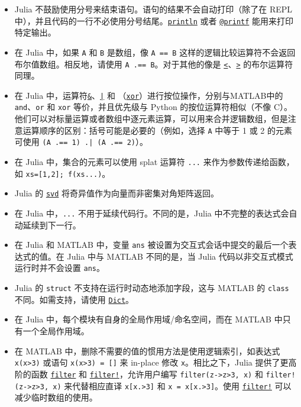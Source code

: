 \begin{itemize}
\item Julia 不鼓励使用分号来结束语句。语句的结果不会自动打印（除了在 REPL 中），并且代码的一行不必使用分号结尾。\hyperlink{783803254548423222}{\texttt{println}} 或者 \hyperlink{13954719910189591998}{\texttt{@printf}} 能用来打印特定输出。


\item 在 Julia 中，如果 \texttt{A} 和 \texttt{B} 是数组，像 \texttt{A == B} 这样的逻辑比较运算符不会返回布尔值数组。相反地，请使用 \texttt{A .== B}。对于其他的像是 \hyperlink{702782232449268329}{\texttt{<}}、\hyperlink{8677991761303191103}{\texttt{>}} 的布尔运算符同理。


\item 在 Julia 中，运算符\hyperlink{1494761116451616317}{\texttt{\&}}、\hyperlink{9633687763646488853}{\texttt{|}} 和 \hyperlink{7071880015536674935}{\texttt{\unicodeveebar{}}}（\hyperlink{7071880015536674935}{\texttt{xor}}）进行按位操作，分别与MATLAB中的\texttt{and}、\texttt{or} 和 \texttt{xor} 等价，并且优先级与 Python 的按位运算符相似（不像 C）。他们可以对标量运算或者数组中逐元素运算，可以用来合并逻辑数组，但是注意运算顺序的区别：括号可能是必要的（例如，选择 \texttt{A} 中等于 1 或 2 的元素可使用 \texttt{(A .== 1) .| (A .== 2)}）。


\item 在 Julia 中，集合的元素可以使用 splat 运算符 \texttt{...} 来作为参数传递给函数，如 \texttt{xs=[1,2]; f(xs...)}。


\item Julia 的 \hyperlink{6661056220970412040}{\texttt{svd}} 将奇异值作为向量而非密集对角矩阵返回。


\item 在 Julia 中，\texttt{...} 不用于延续代码行。不同的是，Julia 中不完整的表达式会自动延续到下一行。


\item 在 Julia 和 MATLAB 中，变量 \texttt{ans} 被设置为交互式会话中提交的最后一个表达式的值。在 Julia 中与 MATLAB 不同的是，当 Julia 代码以非交互式模式运行时并不会设置 \texttt{ans}。


\item Julia 的 \texttt{struct} 不支持在运行时动态地添加字段，这与 MATLAB 的 \texttt{class} 不同。如需支持，请使用 \hyperlink{3089397136845322041}{\texttt{Dict}}。


\item 在 Julia 中，每个模块有自身的全局作用域/命名空间，而在 MATLAB 中只有一个全局作用域。


\item 在 MATLAB 中，删除不需要的值的惯用方法是使用逻辑索引，如表达式 \texttt{x(x>3)} 或语句 \texttt{x(x>3) = []} 来 in-place 修改 \texttt{x}。相比之下，Julia 提供了更高阶的函数 \hyperlink{11445961893478569145}{\texttt{filter}} 和 \hyperlink{3384092630307389071}{\texttt{filter!}}，允许用户编写 \texttt{filter(z->z>3, x)} 和 \texttt{filter!(z->z>3, x)} 来代替相应直译 \texttt{x[x.>3]} 和 \texttt{x = x[x.>3]}。使用 \hyperlink{3384092630307389071}{\texttt{filter!}} 可以减少临时数组的使用。



\end{itemize}
